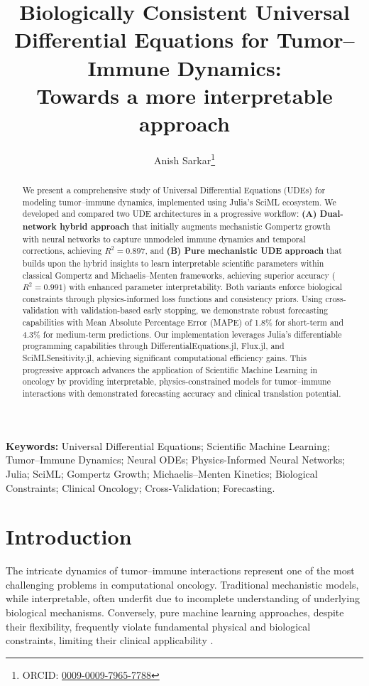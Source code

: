 \documentclass{juliacon}
\title{Biologically Consistent Universal Differential Equations for Tumor--Immune Dynamics:\\
Towards a more interpretable approach}
\author[1]{Anish Sarkar\thanks{ORCID: \href{https://orcid.org/0009-0009-7965-7788}{0009-0009-7965-7788}}}
\affil[1]{Netaji Subhash Engineering College (MAKAUT)}
\date{}
\begin{document}
\maketitle

\begin{abstract}
We present a comprehensive study of Universal Differential Equations (UDEs) for modeling tumor--immune dynamics, implemented using Julia's SciML ecosystem. We developed and compared two UDE architectures in a progressive workflow: \textbf{(A) Dual-network hybrid approach} that initially augments mechanistic Gompertz growth with neural networks to capture unmodeled immune dynamics and temporal corrections, achieving $R^2 = 0.897$, and \textbf{(B) Pure mechanistic UDE approach} that builds upon the hybrid insights to learn interpretable scientific parameters within classical Gompertz and Michaelis--Menten frameworks, achieving superior accuracy ($R^2 = 0.991$) with enhanced parameter interpretability. Both variants enforce biological constraints through physics-informed loss functions and consistency priors. Using cross-validation with validation-based early stopping, we demonstrate robust forecasting capabilities with Mean Absolute Percentage Error (MAPE) of 1.8\% for short-term and 4.3\% for medium-term predictions. Our implementation leverages Julia's differentiable programming capabilities through DifferentialEquations.jl, Flux.jl, and SciMLSensitivity.jl, achieving significant computational efficiency gains. This progressive approach advances the application of Scientific Machine Learning in oncology by providing interpretable, physics-constrained models for tumor--immune interactions with demonstrated forecasting accuracy and clinical translation potential.
\end{abstract}

\noindent\textbf{Keywords:} Universal Differential Equations; Scientific Machine Learning; Tumor--Immune Dynamics; Neural ODEs; Physics-Informed Neural Networks; Julia; SciML; Gompertz Growth; Michaelis--Menten Kinetics; Biological Constraints; Clinical Oncology; Cross-Validation; Forecasting.

\section{Introduction}

The intricate dynamics of tumor--immune interactions represent one of the most challenging problems in computational oncology. Traditional mechanistic models, while interpretable, often underfit due to incomplete understanding of underlying biological mechanisms. Conversely, pure machine learning approaches, despite their flexibility, frequently violate fundamental physical and biological constraints, limiting their clinical applicability \cite{kuznetsov1994,depillis2005validated}.
\end{document}
